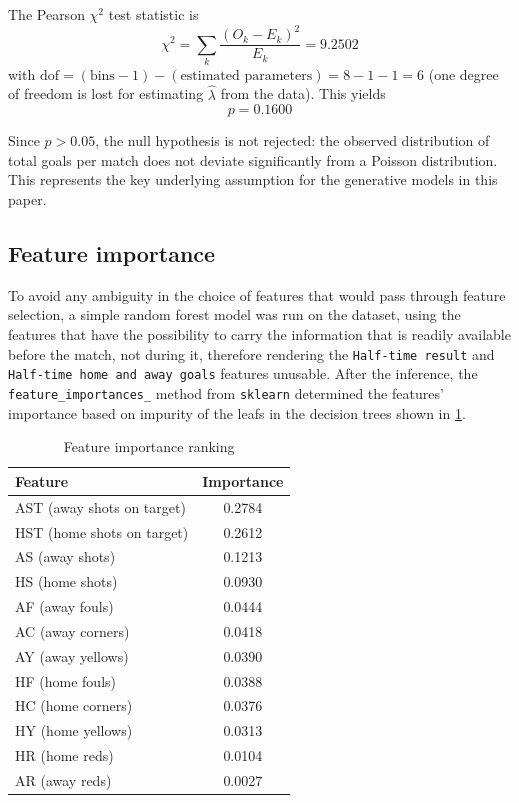 \documentclass{article}
\begin{document}
The Pearson $\chi^2$ test statistic is
\[
\chi^2 = \sum_{k} \frac{(O_k - E_k)^2}{E_k} = 9.2502
\]
with $\mathrm{dof} = (\text{bins} - 1) - (\text{estimated parameters}) = 8 - 1 - 1 = 6$
(one degree of freedom is lost for estimating $\hat{\lambda}$ from the data).
This yields
\[
p = 0.1600
\]

Since $p > 0.05$, the null hypothesis is not rejected: the observed
distribution of total goals per match does not deviate significantly from a Poisson distribution. This represents the key underlying assumption for the generative models in this paper.








\subsection{Feature importance}
To avoid any ambiguity in the choice of features that would pass through feature selection, a simple random forest model was run on the dataset, using the features that have the possibility to carry the information that is readily available before the match, not during it, therefore rendering the \texttt{Half-time result} and \texttt{Half-time home and away goals} features unusable. After the inference, the \texttt{feature\_importances\_} method from \texttt{sklearn} determined the features' importance based on impurity of the leafs in the decision trees shown in \ref{tab:feature_importance}.
\begin{table}[H]
\centering
\begin{tabular}{@{} l c @{}}
\toprule
\textbf{Feature} & \textbf{Importance} \\
\midrule
AST (away shots on target) & 0.2784 \\
HST (home shots on target) & 0.2612 \\
AS (away shots)             & 0.1213 \\
HS (home shots)              & 0.0930 \\
AF (away fouls)              & 0.0444 \\
AC (away corners)            & 0.0418 \\
AY (away yellows)            & 0.0390 \\
HF (home fouls)              & 0.0388 \\
HC (home corners)            & 0.0376 \\
HY (home yellows)            & 0.0313 \\
HR (home reds)               & 0.0104 \\
AR (away reds)               & 0.0027 \\
\bottomrule
\end{tabular}
\caption{Feature importance ranking}
\label{tab:feature_importance}
\end{table}
\end{document}
